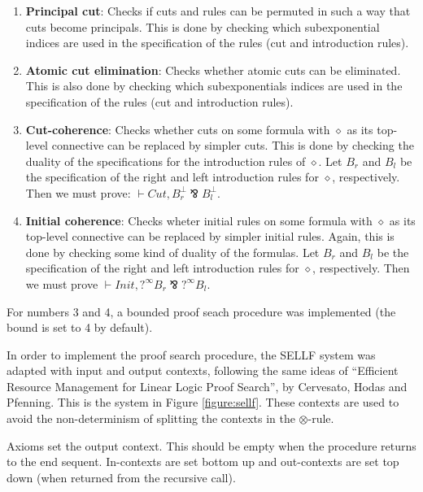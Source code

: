 \documentclass[a4paper, 11pt]{article}
\begin{document}
\begin{enumerate}
  \item \textbf{Principal cut}: Checks if cuts and rules can be permuted in such
  a way that cuts become principals. This is done by checking which subexponential
  indices are used in the specification of the rules (cut and introduction
  rules).
  
  \item \textbf{Atomic cut elimination}: Checks whether atomic cuts can be
  eliminated. This is also done by checking which subexponentials indices are
  used in the specification of the rules (cut and introduction rules).
  
  \item \textbf{Cut-coherence}: Checks whether cuts on some formula with
  $\diamond$ as its top-level connective can be replaced by simpler cuts. This
  is done by checking the duality of the specifications for the introduction
  rules of $\diamond$. Let $B_r$ and $B_l$ be the specification of the right and
  left introduction rules for $\diamond$, respectively. Then we must prove: $\vdash Cut,
  B_r^{\perp} \bindnasrepma B_l^{\perp}$.

  \item \textbf{Initial coherence}: Checks wheter initial rules on some formula
  with $\diamond$ as its top-level connective can be replaced by simpler initial
  rules. Again, this is done by checking some kind of duality of the formulas.
  Let $B_r$ and $B_l$ be the specification of the right and left introduction
  rules for $\diamond$, respectively. Then we must prove $\vdash Init,
  ?^{\infty} B_r \bindnasrepma ?^{\infty} B_l$.
\end{enumerate}

For numbers 3 and 4, a bounded proof seach procedure was implemented (the bound
is set to 4 by default).

In order to implement the proof search procedure, the SELLF system was adapted with
input and output contexts, following the same ideas of ``Efficient Resource
Management for Linear Logic Proof Search'', by Cervesato, Hodas and Pfenning.
This is the system in Figure \ref{figure:sellf}. These contexts are used to
avoid the non-determinism of splitting the contexts in the $\otimes$-rule.

Axioms set the output context. This should be empty when the procedure returns
to the end sequent. In-contexts are set bottom up and out-contexts are set
top down (when returned from the recursive call).
\end{document}
